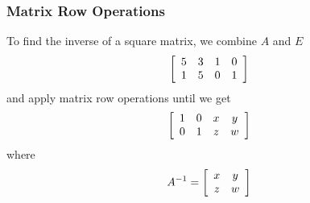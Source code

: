 \documentclass[xcolor=dvipsnames]{beamer}
\begin{document}
\begin{frame}
  \frametitle{Matrix Row Operations}
To find the inverse of a square matrix, we combine $A$ and $E$
  \begin{equation}
    \label{eq:aurohbac}
  \left[\begin{array}{cccc}
 5 & 3 & 1 & 0 \\
 1 & 5 & 0 & 1
  \end{array}\right]\notag
  \end{equation}
and apply matrix row operations until we get
  \begin{equation}
    \label{eq:nahshooh}
  \left[\begin{array}{cccc}
 1 & 0 & x & y \\
 0 & 1 & z & w
  \end{array}\right]\notag
  \end{equation}
where
  \begin{equation}
    \label{eq:aecocaeh}
  A^{-1}=\left[\begin{array}{cc}
 x & y  \\
 z & w 
  \end{array}\right]\notag
  \end{equation}
\end{frame}
\end{document}
